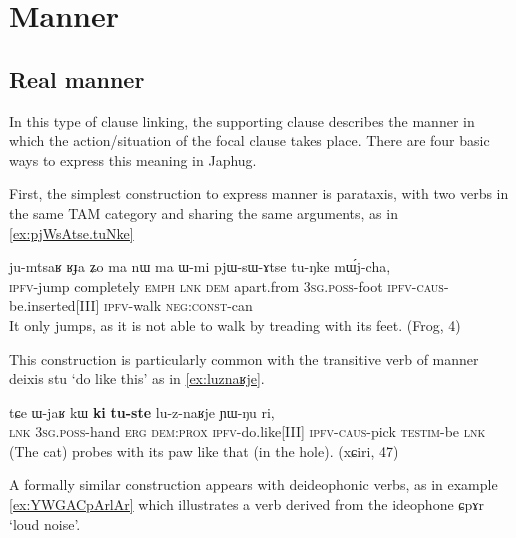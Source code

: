 \documentclass[oldfontcommands,oneside,a4paper,11pt]{article}
\newcommand{\ipa}[1]{{\phon \mbox{#1}}} %
\begin{document}
%
% 
	 
	 

\section{Manner} \label{sec:manner}

 
\subsection{Real manner}
In this type of clause linking, the supporting clause describes the manner in which the action/situation of the focal clause takes place. There are four basic ways to express this meaning in Japhug.

First, the simplest construction to express manner is  parataxis, with    two verbs  in the same TAM category and sharing the same arguments, as in \ref{ex:pjWsAtse.tuNke}

\begin{exe}
\ex \label{ex:pjWsAtse.tuNke}
\gll
\ipa{ju-mtsaʁ} 	\ipa{ʁɟa} 	\ipa{ʑo} 	\ipa{ma} 	\ipa{nɯ} 	\ipa{ma} 	\ipa{ɯ-mi} 	\ipa{pjɯ-sɯ-ɤtse} 	\ipa{tu-ŋke} 	\ipa{mɯ́j-cha,} \\
\textsc{ipfv}-jump completely \textsc{emph} \textsc{lnk} \textsc{dem} apart.from \textsc{3sg.poss}-foot \textsc{ipfv-caus}-be.inserted[III] \textsc{ipfv}-walk \textsc{neg:const}-can \\
\glt It only jumps, as it is not able to walk by treading with its feet.  (Frog, 4)
\end{exe}

This construction is particularly common with the transitive verb of manner deixis \ipa{stu} `do like this' as in \ref{ex:luznaʁje}.

\begin{exe}
\ex \label{ex:luznaʁje}
\gll
\ipa{tɕe} 	\ipa{ɯ-jaʁ} 	\ipa{kɯ} 	\ipa{\textbf{ki}} 	\ipa{\textbf{tu-ste}} 	\ipa{lu-z-naʁje} 	\ipa{ɲɯ-ŋu} 	\ipa{ri,} \\
\textsc{lnk} \textsc{3sg.poss}-hand \textsc{erg} \textsc{dem:prox} \textsc{ipfv}-do.like[III] \textsc{ipfv-caus}-pick \textsc{testim}-be \textsc{lnk} \\
\glt (The cat) probes with its paw like that (in the hole). (xɕiri, 47)
\end{exe}
A formally similar construction appears with deideophonic verbs, as in example \ref{ex:YWGACpArlAr} which illustrates a   verb derived from the ideophone \ipa{ɕpɤr} `loud noise'.  
\end{document}
